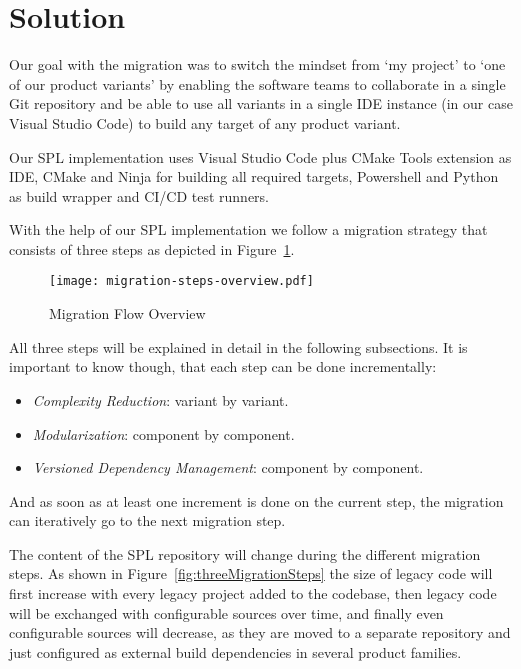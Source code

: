 \section{Solution}\label{solution}

Our goal with the migration was to switch the mindset from `my project' to `one
of our product variants' by enabling the software teams to collaborate in a
single Git repository and be able to use all variants in a single IDE instance
(in our case Visual Studio Code) to build any target of any product variant.

Our SPL implementation uses Visual Studio Code plus CMake Tools extension as
IDE, CMake and Ninja for building all required targets, Powershell and Python as
build wrapper and CI/CD test runners.

With the help of our SPL implementation we follow a migration strategy that
consists of three steps as depicted in Figure~\ref{fig:migrationFlow}.

\begin{figure}[htb]
  \centering
  \texttt{[image: migration-steps-overview.pdf]}
  \caption{Migration Flow Overview}
  \label{fig:migrationFlow}
\end{figure}

All three steps will be explained in detail in the following subsections.
It is important to know though, that each step can be done incrementally:
\begin{itemize}
  \item \textit{Complexity Reduction}: variant by variant.
  \item \textit{Modularization}: component by component.
  \item \textit{Versioned Dependency Management}: component by component.
\end{itemize}

And as soon as at least one increment is done on the current step, the migration
can iteratively go to the next migration step.

The content of the SPL repository will change during the different migration
steps. As shown in Figure~\ref{fig:threeMigrationSteps} the size of legacy code
will first increase with every legacy project added to the codebase, then legacy
code will be exchanged with configurable sources over time, and finally even
configurable sources will decrease, as they are moved to a separate repository
and just configured as external build dependencies in several product families.

